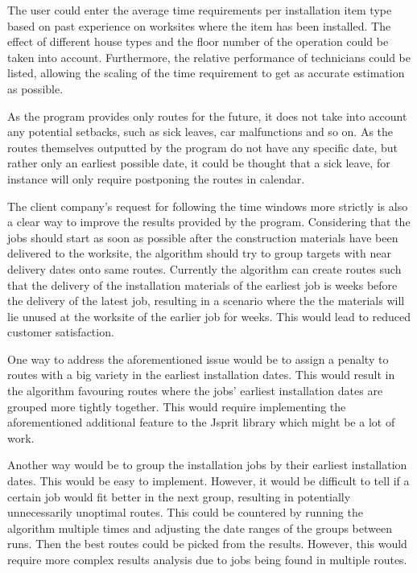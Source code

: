 The user could enter the average time requirements per installation item type based on past experience on worksites where the item has been installed. The effect of different house types and the floor number of the operation could be taken into account. Furthermore, the relative performance of technicians could be listed, allowing the scaling of the time requirement to get as accurate estimation as possible.

As the program provides only routes for the future, it does not take into account any potential setbacks, such as sick leaves, car malfunctions and so on. As the routes themselves outputted by the program do not have any specific date, but rather only an earliest possible date, it could be thought that a sick leave, for instance will only require postponing the routes in calendar.  

The client company's request for following the time windows more strictly is also a clear way to improve the results provided by the program. Considering that the jobs should start as soon as possible after the construction materials have been delivered to the worksite, the algorithm should try to group targets with near delivery dates onto same routes. Currently the algorithm can create routes such that the delivery of the installation materials of the earliest job is weeks before the delivery of the latest job, resulting in a scenario where the the materials will lie  unused at the worksite of the earlier job for weeks. This would lead to reduced customer satisfaction.

One way to address the aforementioned issue would be to assign a penalty to routes with a big variety in the earliest installation dates. This would result in the algorithm favouring routes where the jobs' earliest installation dates are grouped more tightly together. This would require implementing the aforementioned additional feature to the Jsprit library which might be a lot of work. 

Another way would be to group the installation jobs by their earliest installation dates. This would be easy to implement. However, it would be difficult to tell if a certain job would fit better in the next group, resulting in potentially unnecessarily unoptimal routes. This could be countered by running the algorithm multiple times and adjusting the date ranges of the groups between runs. Then the best routes could be picked from the results. However, this would require more complex results analysis due to jobs being found in multiple routes. 

